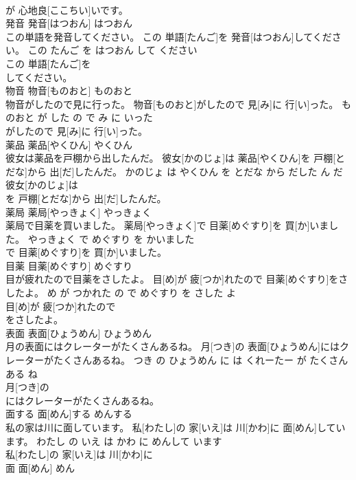 \documentclass[8pt]{extreport}
\begin{document}
\begin{CJK}{UTF8}{min}
\\	が 心地良[ここちい]いです。			
\\	発音	発音[はつおん]	はつおん	
\\	この単語を発音してください。	この 単語[たんご]を 発音[はつおん]してください。	この たんご を はつおん して ください	
\\	この 単語[たんご]を
\\	してください。			
\\	物音	物音[ものおと]	ものおと	
\\	物音がしたので見に行った。	物音[ものおと]がしたので 見[み]に 行[い]った。	ものおと が した の で み に いった	
\\	がしたので 見[み]に 行[い]った。			
\\	薬品	薬品[やくひん]	やくひん	
\\	彼女は薬品を戸棚から出したんだ。	彼女[かのじょ]は 薬品[やくひん]を 戸棚[とだな]から 出[だ]したんだ。	かのじょ は やくひん を とだな から だした ん だ	
\\	彼女[かのじょ]は
\\	を 戸棚[とだな]から 出[だ]したんだ。			
\\	薬局	薬局[やっきょく]	やっきょく	
\\	薬局で目薬を買いました。	薬局[やっきょく]で 目薬[めぐすり]を 買[か]いました。	やっきょく で めぐすり を かいました	
\\	で 目薬[めぐすり]を 買[か]いました。			
\\	目薬	目薬[めぐすり]	めぐすり	
\\	目が疲れたので目薬をさしたよ。	目[め]が 疲[つか]れたので 目薬[めぐすり]をさしたよ。	め が つかれた の で めぐすり を さした よ	
\\	目[め]が 疲[つか]れたので
\\	をさしたよ。			
\\	表面	表面[ひょうめん]	ひょうめん	
\\	月の表面にはクレーターがたくさんあるね。	月[つき]の 表面[ひょうめん]にはクレーターがたくさんあるね。	つき の ひょうめん に は くれーたー が たくさん ある ね	
\\	月[つき]の
\\	にはクレーターがたくさんあるね。			
\\	面する	面[めん]する	めんする	
\\	私の家は川に面しています。	私[わたし]の 家[いえ]は 川[かわ]に 面[めん]しています。	わたし の いえ は かわ に めんして います	
\\	私[わたし]の 家[いえ]は 川[かわ]に
\\	面	面[めん]	めん	

\end{CJK}
\end{document}

